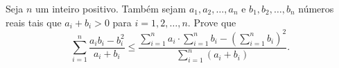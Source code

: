 Seja \(n\) um inteiro positivo. Também sejam \(a_1, a_2, \dots, a_n\) e \(b_1,b_2,\dots, b_n\) números reais tais que \(a_i+b_i>0\) para \(i=1,2,\dots, n\). Prove que
\[
\sum_{i=1}^n \frac{a_ib_i-b_i^2}{a_i+b_i}\le\frac{\displaystyle \sum_{i=1}^n a_i\cdot \sum_{i=1}^n b_i - \left( \sum_{i=1}^n b_i\right) ^2}{\displaystyle\sum_{i=1}^n (a_i+b_i)}.
\]
